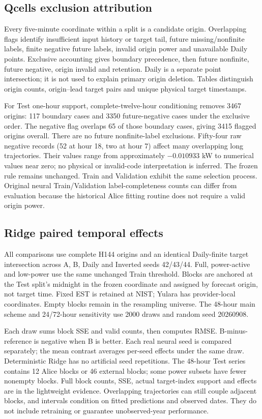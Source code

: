 \subsection{Qcells exclusion attribution}
Every five-minute coordinate within a split is a candidate origin. Overlapping flags identify insufficient input history or target tail, future missing/nonfinite labels, finite negative future labels, invalid origin power and unavailable Daily points. Exclusive accounting gives boundary precedence, then future nonfinite, future negative, origin invalid and retention. Daily is a separate point intersection; it is not used to explain primary origin deletion. Tables distinguish origin counts, origin--lead target pairs and unique physical target timestamps.

For Test one-hour support, complete-twelve-hour conditioning removes 3467 origins: 117 boundary cases and 3350 future-negative cases under the exclusive order. The negative flag overlaps 65 of those boundary cases, giving 3415 flagged origins overall. There are no future nonfinite-label exclusions. Fifty-four raw negative records (52 at hour 18, two at hour 7) affect many overlapping long trajectories. Their values range from approximately $-0.010933$ kW to numerical values near zero; no physical or invalid-code interpretation is inferred. The frozen rule remains unchanged. Train and Validation exhibit the same selection process. Original neural Train/Validation label-completeness counts can differ from evaluation because the historical Alice fitting routine does not require a valid origin power.

\subsection{Ridge paired temporal effects}
All comparisons use complete H144 origins and an identical Daily-finite target intersection across A, B, Daily and Inverted seeds 42/43/44. Full, power-active and low-power use the same unchanged Train threshold. Blocks are anchored at the Test split's midnight in the frozen coordinate and assigned by forecast origin, not target time. Fixed EST is retained at NIST; Yulara has provider-local coordinates. Empty blocks remain in the resampling universe. The 48-hour main scheme and 24/72-hour sensitivity use 2000 draws and random seed 20260908.

Each draw sums block SSE and valid counts, then computes RMSE. B-minus-reference is negative when B is better. Each real neural seed is compared separately; the mean contrast averages per-seed effects under the same draw. Deterministic Ridge has no artificial seed repetitions. The 48-hour Test series contains 12 Alice blocks or 46 external blocks; some power subsets have fewer nonempty blocks. Full block counts, SSE, actual target-index support and effects are in the lightweight evidence. Overlapping trajectories can still couple adjacent blocks, and intervals condition on fitted predictions and observed dates. They do not include retraining or guarantee unobserved-year performance.

